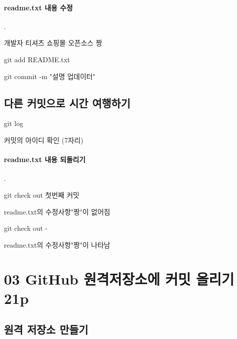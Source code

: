\documentclass[12pt, a4paper, oneside]{book}
\let\stdsection\section
\renewcommand\section{\newpage\stdsection}
\begin{document}
			\paragraph{readme.txt 내용 수정} 
			.\\

			\begin{tcolorbox}
				개발자 티셔츠 쇼핑몰 오픈소스 짱
			\end{tcolorbox}

			\begin{tcolorbox}
				git add  README.txt
			\end{tcolorbox}

			\begin{tcolorbox}
				git commit -m "설명 업데이터"
			\end{tcolorbox}


		\subsection 	{다른 커밋으로 시간 여행하기}

			\begin{tcolorbox}
				git log
			\end{tcolorbox}

			커밋의 아이디 확인 (7자리)

			\paragraph{readme.txt 내용 되돌리기} 
			.\\

			\begin{tcolorbox}
				git check out 첫번째 커밋 
			\end{tcolorbox}
			readme.txt의 수정사항"짱"이 없어짐

			\begin{tcolorbox}
				git check out -
			\end{tcolorbox}
			readme.txt의 수정사항"짱"이 나타남


	\section 	{03 GitHub 원격저장소에 커밋 올리기 21p}

		\subsection 	{원격 저장소 만들기}
\end{document}
